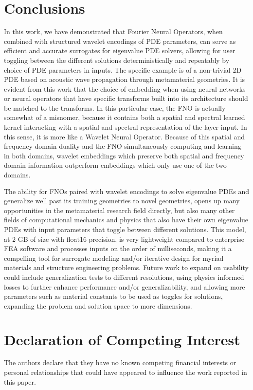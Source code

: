 \documentclass[preprint,review,12pt]{elsarticle}
\begin{document}
\section{Conclusions}
\label{sec:Conclusion}
In this work, we have demonstrated that Fourier Neural Operators, when combined with structured wavelet encodings of PDE parameters, can serve as efficient and accurate surrogates for eigenvalue PDE solvers, allowing for user toggling between the different solutions deterministically and repeatably by choice of PDE parameters in inputs. The specific example is of a non-trivial 2D PDE based on acoustic wave propagation through metamaterial geometries. It is evident from this work that the choice of embedding when using neural networks or neural operators that have specific transforms built into its architecture should be matched to the transforms. In this particular case, the FNO is actually somewhat of a misnomer, because it contains both a spatial and spectral learned kernel interacting with a spatial and spectral representation of the layer input. In this sense, it is more like a Wavelet Neural Operator. Because of this spatial and frequency domain duality and the FNO simultaneously computing and learning in both domains, wavelet embeddings which preserve both spatial and frequency domain information outperform embeddings which only use one of the two domains.

The ability for FNOs paired with wavelet encodings to solve eigenvalue PDEs and generalize well past its training geometries to novel geometries, opens up many opportunities in the metamaterial research field directly, but also many other fields of computational mechanics and physics that also have their own eigenvalue PDEs with input parameters that toggle between different solutions. This model, at 2 GB of size with float16 precision, is very lightweight compared to enterprise FEA software and processes inputs on the order of milliseconds, making it a compelling tool for surrogate modeling and/or iterative design for myriad materials and structure engineering problems. Future work to expand on usability could include generalization tests to different resolutions, using physics informed losses to further enhance performance and/or generalizability, and allowing more parameters such as material constants to be used as toggles for solutions, expanding the problem and solution space to more dimensions.

\section*{Declaration of Competing Interest}
The authors declare that they have no known competing financial interests or personal relationships that could have appeared to influence the work reported in this paper.
\end{document}
